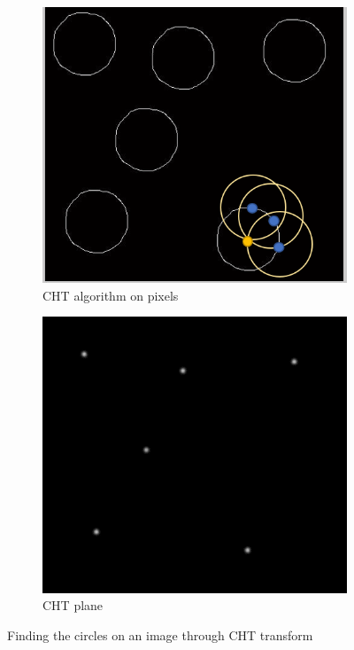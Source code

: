 \documentclass[a4paper]{iacas}
\begin{document}
\vskip 0.1in
\begin{figure}
\centering
  \begin{subfigure}{0.4\linewidth}
	\includegraphics[width=\textwidth]{imgs/q1_81.png}
	\caption{CHT algorithm on pixels}
  \end{subfigure}
	\hfill
  \begin{subfigure}{0.4\linewidth}
	\includegraphics[width=\textwidth]{imgs/q1_82.png}
	\caption{CHT plane}
  \end{subfigure}
\caption{Finding the circles on an image through CHT transform}
\end{figure}
\vskip 0.1in
\end{document}
